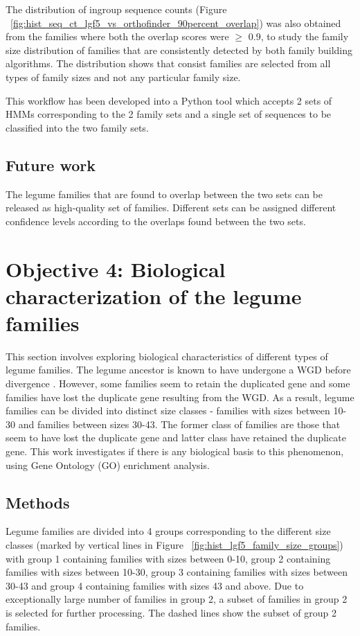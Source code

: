 \documentclass{article}
\begin{document}
		The distribution of ingroup sequence counts (Figure ~\ref{fig:hist_seq_ct_lgf5_vs_orthofinder_90percent_overlap}) was also obtained from the families where both the overlap scores were $\geq$ 0.9, to study the family size distribution of families that are consistently detected by both family building algorithms. The distribution shows that consist families are selected from all types of family sizes and not any particular family size.
				
		This workflow has been developed into a Python tool which accepts 2 sets of HMMs corresponding to the 2 family sets and a single set of sequences to be classified into the two family sets.
		
		\subsection{Future work}
		The legume families that are found to overlap between the two sets can be released as high-quality set of families. Different sets can be assigned different confidence levels according to the overlaps found between the two sets.
	
	\clearpage
	\section{Objective 4: Biological characterization of the legume families}
	This section involves exploring biological characteristics of different types of legume families. The legume ancestor is known to have undergone a WGD before divergence \citep{cannon2014multiple}.  However, some families seem to retain the duplicated gene and some families have lost the duplicate gene resulting from the WGD. As a result, legume families can be divided into distinct size classes - families with sizes between 10-30 and families between sizes 30-43. The former class of families are those that seem to have lost the duplicate gene and latter class have retained the duplicate gene. This work investigates if there is any biological basis to this phenomenon, using Gene Ontology (GO) enrichment analysis. 
	
		\subsection{Methods}
		Legume families are divided into 4 groups corresponding to the different size classes (marked by vertical lines in Figure ~\ref{fig:hist_lgf5_family_size_groups}) with group 1 containing families with sizes between 0-10, group 2 containing families with sizes between 10-30, group 3 containing families with sizes between 30-43 and group 4 containing families with sizes 43 and above. Due to exceptionally large number of families in group 2, a subset of families in group 2 is selected for further processing. The dashed lines show the subset of group 2 families.
		
\end{document}
